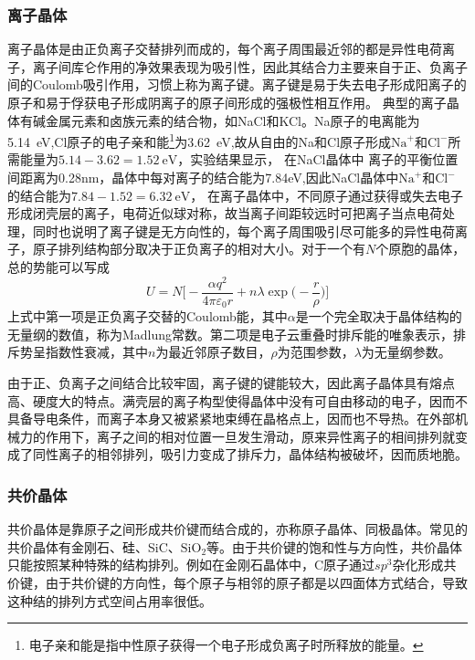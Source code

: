 \subsubsection{离子晶体}
离子晶体是由正负离子交替排列而成的，每个离子周围最近邻的都是异性电荷离子，离子间库仑作用的净效果表现为吸引性，因此其结合力主要来自于正、负离子间的Coulomb吸引作用，习惯上称为离子键。离子键是易于失去电子形成阳离子的原子和易于俘获电子形成阴离子的原子间形成的强极性相互作用。
典型的离子晶体有碱金属元素和卤族元素的结合物，如NaCl和KCl。Na原子的电离能为5.14~eV,Cl原子的电子亲和能\footnote{电子亲和能是指中性原子获得一个电子形成负离子时所释放的能量。}为3.62~eV,故从自由的Na和Cl原子形成$\mathrm{Na}^+$和$\mathrm{Cl}^-$所需能量为$5.14-3.62=1.52~\mathrm{eV}$，实验结果显示，%
在NaCl晶体中%
离子的平衡位置间距离为0.28\textrm{nm}，晶体中每对离子的结合能为7.84\textrm{eV},因此NaCl晶体中$\mathrm{Na}^+$和$\mathrm{Cl}^-$的结合能为$7.84-1.52=6.32~\mathrm{eV}$，%
在离子晶体中，不同原子通过获得或失去电子形成闭壳层的离子，电荷近似球对称，故当离子间距较远时可把离子当点电荷处理，同时也说明了离子键是无方向性的，每个离子周围吸引尽可能多的异性电荷离子，原子排列结构部分取决于正负离子的相对大小。对于一个有$N$个原胞的晶体，总的势能可以写成
\begin{equation}
	U=N\bigg[-\dfrac{\alpha q^2}{4\pi\varepsilon_0r}+n\lambda\exp\big(-\dfrac r{\rho}\big)\bigg]
	\label{eq:SSI-03}
\end{equation} 
上式中第一项是正负离子交替的Coulomb能，其中$\alpha$是一个完全取决于晶体结构的无量纲的数值，称为Madlung常数。第二项是电子云重叠时排斥能的唯象表示，排斥势呈指数性衰减，其中$n$为最近邻原子数目，$\rho$为范围参数，$\lambda$为无量纲参数。

由于正、负离子之间结合比较牢固，离子键的键能较大，因此离子晶体具有熔点高、硬度大的特点。满壳层的离子构型使得晶体中没有可自由移动的电子，因而不具备导电条件，而离子本身又被紧紧地束缚在晶格点上，因而也不导热。在外部机械力的作用下，离子之间的相对位置一旦发生滑动，原来异性离子的相间排列就变成了同性离子的相邻排列，吸引力变成了排斥力，晶体结构被破坏，因而质地脆。

\subsubsection{共价晶体} 
共价晶体是靠原子之间形成共价键而结合成的，亦称原子晶体、同极晶体。常见的共价晶体有金刚石、硅、SiC、$\mathrm{SiO}_2$等。由于共价键的饱和性与方向性，共价晶体只能按照某种特殊的结构排列。例如在金刚石晶体中，C原子通过$sp^3$杂化形成共价键，由于共价键的方向性，每个原子与相邻的原子都是以四面体方式结合，导致这种结的排列方式空间占用率很低。

